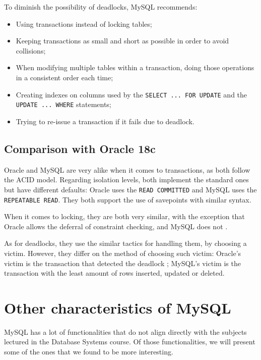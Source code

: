 \documentclass[12pt]{article}
\newcounter{subsubsubsection}[subsubsection]
\begin{document}
To diminish the possibility of deadlocks, MySQL recommends: 
\begin{itemize}
    \item Using transactions instead of locking tables;
  
    \item Keeping transactions as small and short as possible in order to avoid collisions;
    
    \item When modifying multiple tables within a transaction, doing those operations in a consistent order each time;
    
    \item Creating indexes on columns used by the \verb|SELECT ... FOR UPDATE|  and the \verb|UPDATE ... WHERE| statements;
    
    \item Trying to re-issue a transaction if it fails due to deadlock.
\end{itemize}


\subsection{Comparison with Oracle 18c}
\label{transactionComp}
Oracle and MySQL are very alike when it comes to transactions, as both follow the ACID model. Regarding isolation levels, both implement the standard ones but have different defaults: Oracle uses the \verb|READ COMMITTED| and MySQL uses the \verb|REPEATABLE READ|. They both support the use of savepoints with similar syntax. 

When it comes to locking, they are both very similar, with the exception that Oracle allows the deferral of constraint checking, and MySQL does not \parencite{OracleConstraintDefered}.

As for deadlocks, they use the similar tactics for handling them, by choosing a victim. However, they differ on the method of choosing such victim: Oracle's victim is the transaction that detected the deadlock \parencite{OracleLocksAndDead}; MySQL's victim is the transaction with the least amount of rows inserted, updated or deleted.





\newpage
\section{Other characteristics of MySQL}
\label{otherCharacteristics}
MySQL has a lot of functionalities that do not align directly with the subjects lectured in the Database Systems course. Of those functionalities, we will present some of the ones that we found to be more interesting.
\end{document}
